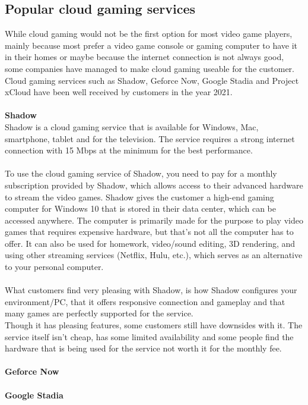 \subsection{Popular cloud gaming services}
While cloud gaming would not be the first option for most video game players, mainly because most prefer a video game console or gaming computer to have it in their homes or maybe because the internet connection is not always good, some companies have managed to make cloud gaming useable for the customer. Cloud gaming services such as Shadow, Geforce Now, Google Stadia and Project xCloud have been well received by customers in the year 2021.\\\\
\textbf{Shadow}\\
Shadow is a cloud gaming service that is available for Windows, Mac, smartphone, tablet and for the television. The service requires a strong internet connection with 15 Mbps at the minimum for the best performance.\\\\
To use the cloud gaming service of Shadow, you need to pay for a monthly subscription provided by Shadow, which allows access to their advanced hardware to stream the video games. Shadow gives the customer a high-end gaming computer for Windows 10 that is stored in their data center, which can be accessed anywhere. The computer is primarily made for the purpose to play video games that requires expensive hardware, but that's not all the computer has to offer. It can also be used for homework, video/sound editing, 3D rendering, and using other streaming services (Netflix, Hulu, etc.), which serves as an alternative to your personal computer.\\\\
What customers find very pleasing with Shadow, is how Shadow configures your environment/PC, that it offers responsive connection and gameplay and that many games are perfectly supported for the service.\\Though it has pleasing features, some customers still have downsides with it. The service itself isn't cheap, has some limited availability and some people find the hardware that is being used for the service not worth it for the monthly fee.\\\\
\textbf{Geforce Now}\\\\
\textbf{Google Stadia}\\\\
